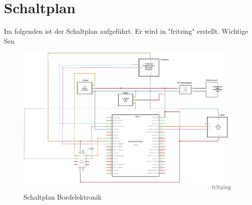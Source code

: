 \chapter{Schaltplan}
\label{appendix:schaltplan}
Im folgenden ist der Schaltplan aufgeführt. Er wird in "fritzing" erstellt. Wichtige Sen
\begin{figure}[H]
    \centering
    \includegraphics[angle=90,width=\textwidth,height=\textheight,keepaspectratio]{assets/schaltplan5.png}
    \caption{Schaltplan Bordelektronik}
\end{figure}
